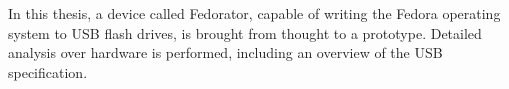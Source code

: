 In this thesis, a device called Fedorator, capable of writing the Fedora operating system to USB flash drives, is brought from thought to a prototype.  Detailed analysis over hardware is performed, including an overview of the USB specification.

